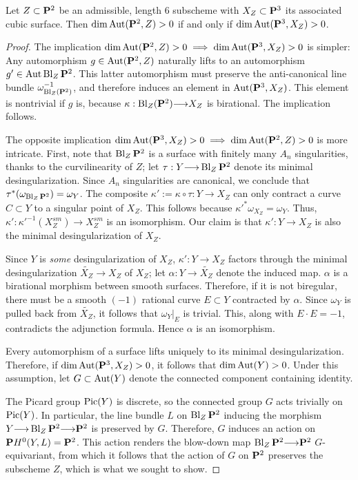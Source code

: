 \documentclass[12pt,reqno]{amsart}
\DeclareMathOperator{\Bl}{Bl}
\renewcommand{\to}{{\longrightarrow}}
\numberwithin{equation}{section}
\begin{document}
\begin{proposition}
  \label{prop:good} Let $Z \subset \P^2$ be an admissible, length $6$
  subscheme with $X_Z \subset \P^3$ its associated cubic surface. Then
  $\dim \Aut(\P^2,Z) > 0$ if and only if $\dim \Aut(\P^3,X_Z) > 0$.
\end{proposition}

\begin{proof} The implication
  $\dim \Aut(\P^2,Z) > 0 \implies \dim \Aut(\P^3,X_Z) > 0$ is simpler:
  Any automorphism $g \in \Aut(\P^2,Z)$ naturally lifts to an
  automorphism $g' \in \Aut \Bl_{Z}\P^2$. This latter automorphism
  must preserve the anti-canonical line bundle
  $\omega_{\Bl_{Z}(\P^2)}^{-1}$, and therefore induces an element in
  $\Aut(\P^3, X_Z)$. This element is nontrivial if $g$ is, because
  $\kappa: \Bl_{Z}(\P^2) \to X_Z$ is birational. The implication
  follows.


  The opposite implication
  $\dim \Aut(\P^3,X_Z) > 0 \implies \dim \Aut(\P^2,Z) > 0$ is more
  intricate. First, note that $\Bl_{Z}\P^2$ is a surface with finitely
  many $A_n$ singularities, thanks to the curvilinearity of $Z$; let
  $\tau: Y \to \Bl_{Z}\P^2$ denote its minimal desingularization.
  Since $A_n$ singularities are canonical, we conclude that
  $\tau^{*}(\omega_{\Bl_{Z}\P^2}) = \omega_{Y}$.  The composite
  $\kappa':= \kappa \circ \tau: Y \to X_{Z}$ can only contract a curve
  $C \subset Y$ to a singular point of $X_Z$.  This follows because   
  $\kappa'^{*}\omega_{X_{Z}} = \omega_{Y}$. Thus,
  $\kappa': \kappa'^{-1}(X_{Z}^{sm}) \to X_{Z}^{sm}$ is an
  isomorphism. Our claim is that $\kappa':Y \to X_{Z}$ is also the
  minimal desingularization of $X_Z$.

  Since $Y$ is {\sl some} desingularization of $X_Z$,
  $\kappa':Y \to X_{Z}$ factors through the minimal desingularization
  $\widetilde{X_{Z}} \to X_{Z}$ of $X_{Z}$; let
  $\alpha: Y \to \widetilde{X_{Z}}$ denote the induced map. $\alpha$
  is a birational morphism between smooth surfaces. Therefore, if it
  is not biregular, there must be a smooth $(-1)$ rational curve
  $E \subset Y$ contracted by $\alpha$.  Since $\omega_{Y}$ is pulled
  back from $\widetilde{X_{Z}}$, it follows that $\omega_{Y}|_{E}$ is
  trivial. This, along with $E \cdot E = -1$, contradicts the
  adjunction formula.  Hence $\alpha$ is an isomorphism.

  Every automorphism of a surface lifts uniquely to its minimal
  desingularization. Therefore, if $\dim \Aut(\P^3,X_Z) >0 $, it
  follows that $\dim \Aut(Y) >0$. Under this assumption, let
  $G \subset \Aut(Y)$ denote the connected component containing
  identity.

  The Picard group $\Pic(Y)$ is discrete, so the connected group $G$
  acts trivially on $\Pic(Y)$.  In particular, the line bundle $L$ on
  $\Bl_{Z}\P^2$ inducing the morphism $Y \to \Bl_{Z}\P^2 \to \P^2$ is
  preserved by $G$. Therefore, $G$ induces an action on
  $\P H^0(Y,L)= \P^2$.  This action renders the blow-down map
  $\Bl_{Z}\P^2 \to \P^2$ $G$-equivariant, from which it follows that
  the action of $G$ on $\P^2$ preserves the subscheme $Z$, which is
  what we sought to show.

  
\end{proof}
\end{document}

